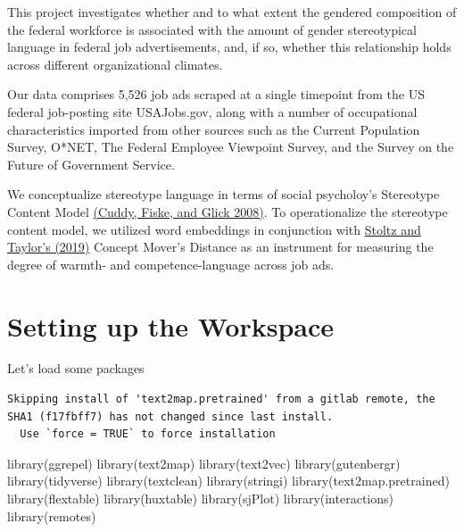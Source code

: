 \documentclass[
  letterpaper,
  DIV=11,
  numbers=noendperiod]{scrreprt}
\newenvironment{Shaded}{\begin{snugshade}}{\end{snugshade}}
\newcommand{\FunctionTok}[1]{\textcolor[rgb]{0.28,0.35,0.67}{#1}}
\newcommand{\NormalTok}[1]{\textcolor[rgb]{0.00,0.23,0.31}{#1}}
\begin{document}
This project investigates whether and to what extent the gendered
composition of the federal workforce is associated with the amount of
gender stereotypical language in federal job advertisements, and, if so,
whether this relationship holds across different organizational
climates.

Our data comprises 5,526 job ads scraped at a single timepoint from the
US federal job-posting site USAJobs.gov, along with a number of
occupational characteristics imported from other sources such as the
Current Population Survey, O*NET, The Federal Employee Viewpoint Survey,
and the Survey on the Future of Government Service.

We conceptualize stereotype language in terms of social psycholoy's
Stereotype Content Model
\href{https://www.sciencedirect.com/science/article/pii/S0065260107000020?casa_token=HABSzi8Y7JMAAAAA:LBi45HX4KWxLfP4LLjsP8ySkpW1JtcZBNl67r55dZjmKbzsggVNarS--N6Y9XWdcn_q3zGfTI_c}{(Cuddy,
Fiske, and Glick 2008)}. To operationalize the stereotype content model,
we utilized word embeddings in conjunction with
\href{https://link.springer.com/article/10.1007/s42001-019-00048-6}{Stoltz
and Taylor's (2019)} Concept Mover's Distance as an instrument for
measuring the degree of warmth- and competence-language across job ads.

\section{Setting up the Workspace}\label{setting-up-the-workspace}

Let's load some packages

\begin{verbatim}
Skipping install of 'text2map.pretrained' from a gitlab remote, the SHA1 (f17fbff7) has not changed since last install.
  Use `force = TRUE` to force installation
\end{verbatim}

\begin{Shaded}
\begin{Highlighting}[]
\FunctionTok{library}\NormalTok{(ggrepel)}
\FunctionTok{library}\NormalTok{(text2map)}
\FunctionTok{library}\NormalTok{(text2vec)}
\FunctionTok{library}\NormalTok{(gutenbergr)}
\FunctionTok{library}\NormalTok{(tidyverse)}
\FunctionTok{library}\NormalTok{(textclean)}
\FunctionTok{library}\NormalTok{(stringi)}
\FunctionTok{library}\NormalTok{(text2map.pretrained)}
\FunctionTok{library}\NormalTok{(flextable)}
\FunctionTok{library}\NormalTok{(huxtable)}
\FunctionTok{library}\NormalTok{(sjPlot)}
\FunctionTok{library}\NormalTok{(interactions)}
\FunctionTok{library}\NormalTok{(remotes)}
\end{Highlighting}
\end{Shaded}
\end{document}
